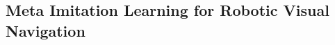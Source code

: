 \subsection{Meta Imitation Learning for Robotic Visual Navigation}\label{sec:meta-imitation-learning-for-robotic-visual-navigation}